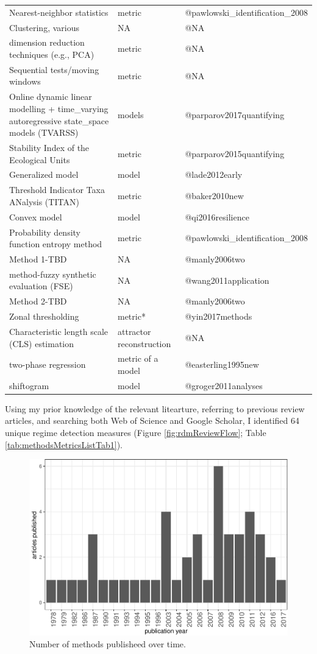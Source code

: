 \documentclass[12pt,twoside,openany]{reedthesis}
\begin{document}
\begin{longtable}{lll}
Nearest-neighbor statistics & metric & @pawlowski\_identification\_2008\\
Clustering, various & NA & @NA\\
dimension reduction techniques (e.g., PCA) & metric & @NA\\
\addlinespace
Sequential tests/moving windows & metric & @NA\\
Online dynamic linear modelling +  time\_varying autoregressive state\_space models (TVARSS) & models & @parparov2017quantifying\\
Stability Index of the Ecological Units & metric & @parparov2015quantifying\\
Generalized model & model & @lade2012early\\
Threshold Indicator Taxa ANalysis (TITAN) & metric & @baker2010new\\
\addlinespace
Convex model & model & @qi2016resilience\\
Probability density function entropy method & metric & @pawlowski\_identification\_2008\\
Method 1-TBD & NA & @manly2006two\\
method-fuzzy synthetic evaluation (FSE) & NA & @wang2011application\\
Method 2-TBD & NA & @manly2006two\\
\addlinespace
Zonal thresholding & metric* & @yin2017methods\\
Characteristic length scale (CLS) estimation & attractor reconstruction & @NA\\
two-phase regression & metric of a model & @easterling1995new\\
shiftogram & model & @groger2011analyses\\*
\end{longtable}
Using my prior knowledge of the relevant litearture, referring to
previous review articles, and searching both Web of Science and Google
Scholar, I identified 64 unique regime detection measures (Figure
\ref{fig:rdmReviewFlow}; Table \ref{tab:methodsMetricsListTab1}).
\begin{figure}
\centering
\includegraphics{_myDissertation_files/figure-latex/jrnlYearFig-1.pdf}
\caption{\label{fig:jrnlYearFig}Number of methods publisheed over time.}
\end{figure}
\end{document}

